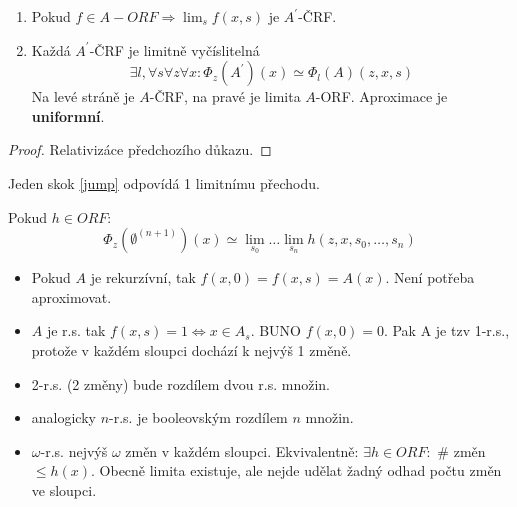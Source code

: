 \begin{theorem}
	\begin{enumerate}
		\item Pokud $f \in A-ORF \Rightarrow \lim_s f(x, s)$ je $A^{\prime}$-ČRF.
		\item Každá $A^{\prime}$-ČRF je limitně vyčíslitelná
			\[ \exists l, \forall s \forall z \forall x: \Phi_z(A^{\prime})(x) \simeq \Phi_l(A)(z, x, s) \]
			Na levé stráně je $A$-ČRF, na pravé je limita $A$-ORF.
			Aproximace je \textbf{uniformní}.
	\end{enumerate}
\end{theorem}
\begin{proof}
	Relativizáce předchozího důkazu.
\end{proof}

\begin{consequence}
	Jeden skok \cref{jump} odpovídá 1 limitnímu přechodu.
\end{consequence}

\begin{theorem}
	Pokud $h \in ORF$:
	\[ \Phi_z(\emptyset^{(n + 1)})(x) \simeq \lim_{s_0} \ldots \lim_{s_n} h(z, x, s_0, \ldots, s_n) \]
\end{theorem}

\begin{note}
	\begin{itemize}
		\item Pokud $A$ je rekurzívní, tak $f(x, 0) = f(x, s) = A(x)$.
	Není potřeba aproximovat.
	\item $A$ je r.s. tak $f(x, s) = 1 \iff x \in A_s$. BUNO $f(x, 0) = 0$.
		Pak A je tzv 1-r.s., protože v každém sloupci dochází k nejvýš 1 změně.
	\item 2-r.s. (2 změny) bude rozdílem dvou r.s. množin.
	\item analogicky $n$-r.s. je booleovským rozdílem $n$ množin.
	\item $\omega$-r.s. nejvýš $\omega$ změn v každém sloupci.
		Ekvivalentně: $\exists h \in ORF:$ \# změn $\leq h(x)$.
		Obecně limita existuje, ale nejde udělat žadný odhad počtu změn ve sloupci.
	\end{itemize}
\end{note}
